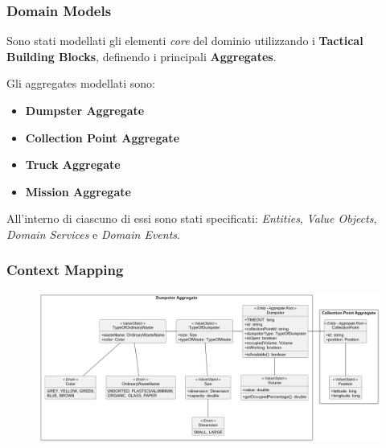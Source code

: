 \begin{frame}
    \frametitle{Domain Models}
    Sono stati modellati gli elementi \textit{core} del dominio utilizzando i \textbf{Tactical Building Blocks},
    definendo i principali \textbf{Aggregates}.

    \bigskip

    Gli aggregates modellati sono:
    \begin{itemize}
        \item \textbf{Dumpster Aggregate}
        \item \textbf{Collection Point Aggregate}
        \item \textbf{Truck Aggregate}
        \item \textbf{Mission Aggregate}
    \end{itemize}

    \bigskip

    All'interno di ciascuno di essi sono stati specificati: \textit{Entities}, \textit{Value Objects},
    \textit{Domain Services} e \textit{Domain Events}.

\end{frame}

\begin{frame}
    \frametitle{Context Mapping}

    \begin{figure}[H]
        \centering
        \includegraphics[width=\linewidth]{../img/disposal-domain-model}
    \end{figure}

\end{frame}

